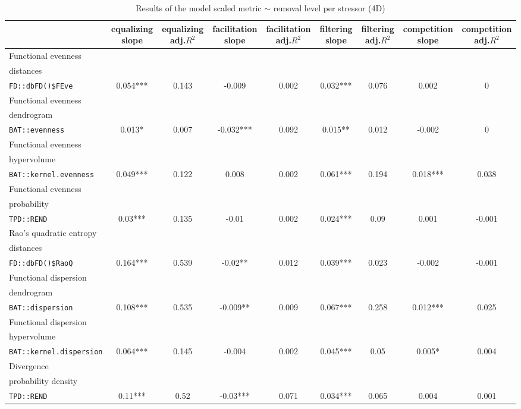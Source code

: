 \documentclass[12pt,letterpaper]{article}
\begin{document}
\begin{landscape}
\begin{table}
\scriptsize
\caption{Results of the model scaled metric $\sim$ removal level per stressor (4D)}
\centering
\begin{tabular}[t]{l|c|c|c|c|c|c|c|c}
\hline
  & equalizing slope & equalizing adj.$R^{2}$ & facilitation slope & facilitation adj.$R^{2}$ & filtering slope & filtering adj.$R^{2}$ & competition slope & competition adj.$R^{2}$\\
\hline
Functional evenness\\distances\\ \texttt{FD::dbFD()\$FEve} & 0.054*** & 0.143 & -0.009 & 0.002 & 0.032*** & 0.076 & 0.002 & 0\\
\hline
Functional evenness\\dendrogram\\ \texttt{BAT::evenness} & 0.013* & 0.007 & -0.032*** & 0.092 & 0.015** & 0.012 & -0.002 & 0\\
\hline
Functional evenness\\hypervolume\\ \texttt{BAT::kernel.evenness} & 0.049*** & 0.122 & 0.008 & 0.002 & 0.061*** & 0.194 & 0.018*** & 0.038\\
\hline
Functional evenness\\probability\\ \texttt{TPD::REND} & 0.03*** & 0.135 & -0.01 & 0.002 & 0.024*** & 0.09 & 0.001 & -0.001\\
\hline
Rao's quadratic entropy\\distances\\ \texttt{FD::dbFD()\$RaoQ} & 0.164*** & 0.539 & -0.02** & 0.012 & 0.039*** & 0.023 & -0.002 & -0.001\\
\hline
Functional dispersion\\dendrogram\\ \texttt{BAT::dispersion} & 0.108*** & 0.535 & -0.009** & 0.009 & 0.067*** & 0.258 & 0.012*** & 0.025\\
\hline
Functional dispersion\\hypervolume\\ \texttt{BAT::kernel.dispersion} & 0.064*** & 0.145 & -0.004 & 0.002 & 0.045*** & 0.05 & 0.005* & 0.004\\
\hline
Divergence\\probability density\\ \texttt{TPD::REND} & 0.11*** & 0.52 & -0.03*** & 0.071 & 0.034*** & 0.065 & 0.004 & 0.001\\

\end{tabular}
\end{table}
\end{landscape}
\end{document}
